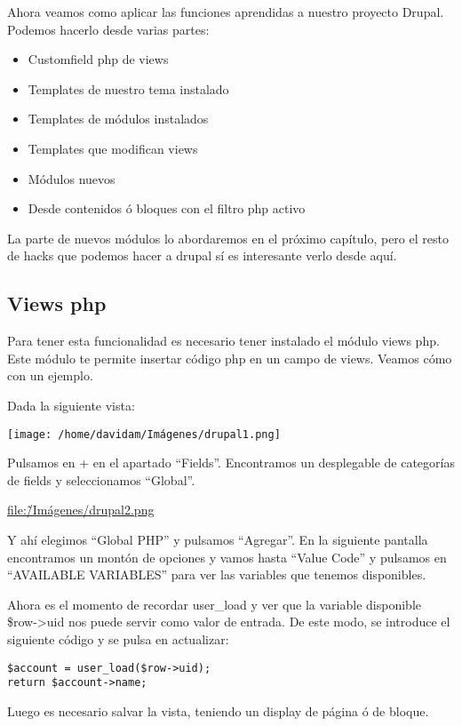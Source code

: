 \documentclass[11pt]{article}
\begin{document}
Ahora veamos como aplicar las funciones aprendidas a nuestro proyecto
Drupal. Podemos hacerlo desde varias partes:

\begin{itemize}
\item Customfield php de views
\item Templates de nuestro tema instalado
\item Templates de módulos instalados
\item Templates que modifican views
\item Módulos nuevos
\item Desde contenidos ó bloques con el filtro php activo
\end{itemize}
La parte de nuevos módulos lo abordaremos en el próximo capítulo, pero
el resto de hacks que podemos hacer a drupal sí es interesante verlo
desde aquí.

\subsection{Views php}
\label{sec-1.5}


Para tener esta funcionalidad es necesario tener instalado el módulo
views php. Este módulo te permite insertar código php en un campo de
views. Veamos cómo con un ejemplo.  

Dada la siguiente vista:

\texttt{[image: /home/davidam/Imágenes/drupal1.png]}

Pulsamos en + en el apartado ``Fields''. Encontramos un desplegable de
categorías de fields y seleccionamos ``Global''.

\href{file://.~/Imágenes/drupal2.png}{file:\~/Imágenes/drupal2.png}

Y ahí elegimos ``Global PHP'' y pulsamos ``Agregar''. En la siguiente
pantalla encontramos un montón de opciones y vamos hasta ``Value Code''
y pulsamos en ``AVAILABLE VARIABLES'' para ver las variables que tenemos
disponibles.

Ahora es el momento de recordar user\_load y ver que la variable
disponible \$row->uid nos puede servir como valor de entrada. De este
modo, se introduce el siguiente código y se pulsa en actualizar:


\begin{verbatim}
$account = user_load($row->uid);
return $account->name;
\end{verbatim}



Luego es necesario salvar la vista, teniendo un display de página ó de
bloque.
\end{document}
